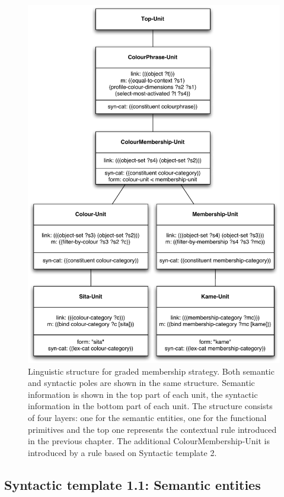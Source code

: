 \begin{figure}[htbp]
  \centering
  \includegraphics[width=.85\textwidth]{./graded-membership/figures/linguistic-structure.pdf}
  \caption[Linguistic structure for graded membership
  strategy]{Linguistic structure for graded membership strategy. Both
    semantic and syntactic poles are shown in the same
    structure. Semantic information is shown in the top part of each
    unit, the syntactic information in the bottom part of each
    unit. The structure consists of four layers: one for the semantic
    entities, one for the functional primitives and the top one
    represents the contextual rule introduced in the previous
    chapter. The additional ColourMembership-Unit is introduced by a
    rule based on Syntactic template 2.}
  \label{f:gms-linguistic-structure}
\end{figure}

\subsection{Syntactic template 1.1: Semantic entities}

